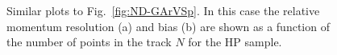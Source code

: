 \begin{figure}[!ht]
\begin{subfigure}[b]{0.43\textwidth}
         \caption{}
         \label{fig:BiasND-GArVSNPoints}
     \end{subfigure}
        \caption{Similar plots to Fig.~\ref{fig:ND-GArVSp}. In this case the relative momentum resolution (a) and bias (b) are shown as a function of the number of points in the track $N$ for the HP sample.}
        \label{fig:ND-GArVSNPoints}
\end{figure}


